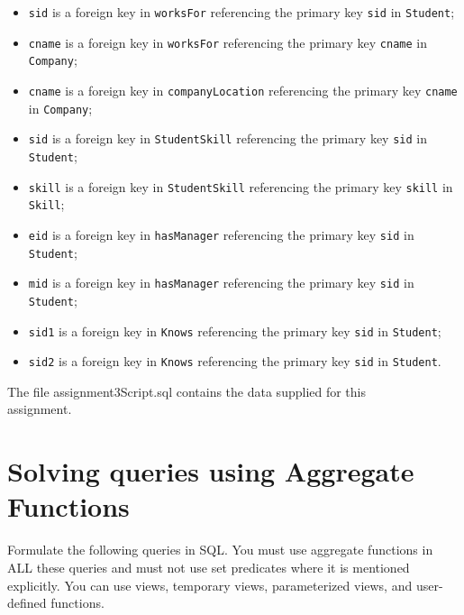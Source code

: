 \documentclass{article}
\begin{document}
\begin{itemize}
\item \texttt{sid} is a foreign key in \texttt{worksFor} referencing the primary key \texttt{sid} in \texttt{Student};
\item \texttt{cname} is a foreign key in \texttt{worksFor} referencing the primary key \texttt{cname} in \texttt{Company};
\item \texttt{cname} is a foreign key in \texttt{companyLocation} referencing the primary key \texttt{cname} in \texttt{Company};
\item \texttt{sid} is a foreign key in \texttt{StudentSkill} referencing the primary key \texttt{sid} in \texttt{Student};
\item \texttt{skill} is a foreign key in \texttt{StudentSkill} referencing the primary key \texttt{skill} in \texttt{Skill};
\item \texttt{eid} is a foreign key in \texttt{hasManager} referencing the primary key \texttt{sid} in \texttt{Student};
\item \texttt{mid} is a foreign key in \texttt{hasManager} referencing the primary key \texttt{sid} in \texttt{Student};
\item \texttt{sid1} is a foreign key in \texttt{Knows} referencing the primary key \texttt{sid} in \texttt{Student};
\item \texttt{sid2} is a foreign key in \texttt{Knows} referencing the primary key \texttt{sid} in \texttt{Student}.
\end{itemize}

The file assignment3Script.sql contains the data supplied for this \\
assignment.

\newpage
\section{Solving queries using Aggregate Functions}

Formulate the following queries in SQL. You must use aggregate functions in ALL these queries and must not use set predicates where it is mentioned explicitly. You can use views, temporary views, parameterized views, and user-defined functions.
\end{document}
